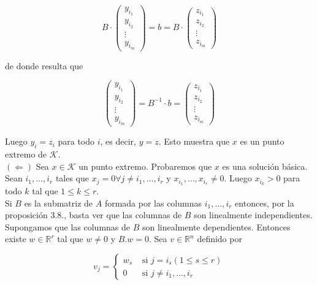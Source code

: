 \documentclass[10pt]{article}
\begin{document}
$$
B \cdot\left(\begin{array}{c}
y_{i_{1}} \\
y_{i_{2}} \\
\vdots \\
y_{i_{m}}
\end{array}\right)=b=B \cdot\left(\begin{array}{c}
z_{i_{1}} \\
z_{i_{2}} \\
\vdots \\
z_{i_{m}}
\end{array}\right)
$$

de donde resulta que

$$
\left(\begin{array}{c}
y_{i_{1}} \\
y_{i_{2}} \\
\vdots \\
y_{i_{m}}
\end{array}\right)=B^{-1} \cdot b=\left(\begin{array}{c}
z_{i_{1}} \\
z_{i_{2}} \\
\vdots \\
z_{i_{m}}
\end{array}\right)
$$

Luego $y_{i}=z_{i}$ para todo $i$, es decir, $y=z$. Esto muestra que $x$ es un punto extremo de $\mathcal{K}$.\\
$(\Longleftarrow)$ Sea $x \in \mathcal{K}$ un punto extremo. Probaremos que $x$ es una solución básica. Sean $i_{1}, \ldots, i_{r}$ tales que $x_{j}=0 \forall j \neq i_{1}, \ldots, i_{r}$ y $x_{i_{1}}, \ldots, x_{i_{r}} \neq 0$. Luego $x_{i_{k}}>0$ para todo $k$ tal que $1 \leq k \leq r$.\\
Si $B$ es la submatriz de $A$ formada por las columnas $i_{1}, \ldots, i_{r}$ entonces, por la proposición 3.8., basta ver que las columnas de $B$ son linealmente independientes.\\
Supongamos que las columnas de $B$ son linealmente dependientes. Entonces existe $w \in \mathbb{R}^{r}$ tal que $w \neq 0$ y $B . w=0$. Sea $v \in \mathbb{R}^{n}$ definido por

$$
v_{j}= \begin{cases}w_{s} & \text { si } j=i_{s}(1 \leq s \leq r) \\ 0 & \text { si } j \neq i_{1}, \ldots, i_{r}\end{cases}
$$
\end{document}
